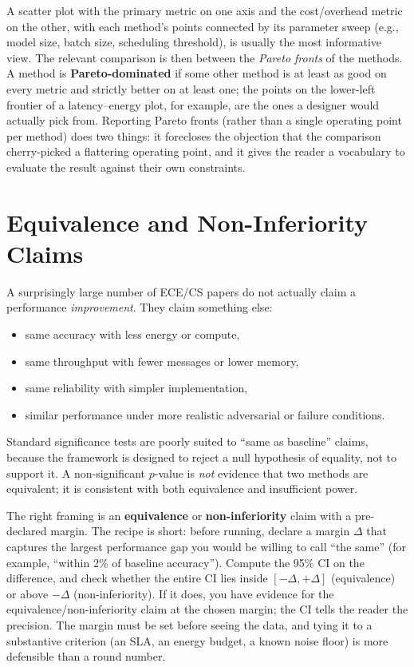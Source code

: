 \documentclass[11pt]{article}
\begin{document}
A scatter plot with the primary metric on one axis and the cost/overhead metric on the other, with each method's points connected by its parameter sweep (e.g., model size, batch size, scheduling threshold), is usually the most informative view. The relevant comparison is then between the \emph{Pareto fronts} of the methods. A method is \textbf{Pareto-dominated} if some other method is at least as good on every metric and strictly better on at least one; the points on the lower-left frontier of a latency--energy plot, for example, are the ones a designer would actually pick from. Reporting Pareto fronts (rather than a single operating point per method) does two things: it forecloses the objection that the comparison cherry-picked a flattering operating point, and it gives the reader a vocabulary to evaluate the result against their own constraints.

\section{Equivalence and Non-Inferiority Claims}
\label{sec:equivalence}

A surprisingly large number of ECE/CS papers do not actually claim a performance \emph{improvement}. They claim something else:

\begin{itemize}[leftmargin=*, itemsep=1pt]
    \item same accuracy with less energy or compute,
    \item same throughput with fewer messages or lower memory,
    \item same reliability with simpler implementation,
    \item similar performance under more realistic adversarial or failure conditions.
\end{itemize}

Standard significance tests are poorly suited to ``same as baseline'' claims, because the framework is designed to reject a null hypothesis of equality, not to support it. A non-significant $p$-value is \emph{not} evidence that two methods are equivalent; it is consistent with both equivalence and insufficient power.

The right framing is an \textbf{equivalence} or \textbf{non-inferiority} claim with a pre-declared margin. The recipe is short: before running, declare a margin $\Delta$ that captures the largest performance gap you would be willing to call ``the same'' (for example, ``within 2\% of baseline accuracy''). Compute the 95\% CI on the difference, and check whether the entire CI lies inside $[-\Delta, +\Delta]$ (equivalence) or above $-\Delta$ (non-inferiority). If it does, you have evidence for the equivalence/non-inferiority claim at the chosen margin; the CI tells the reader the precision. The margin must be set before seeing the data, and tying it to a substantive criterion (an SLA, an energy budget, a known noise floor) is more defensible than a round number.
\end{document}
